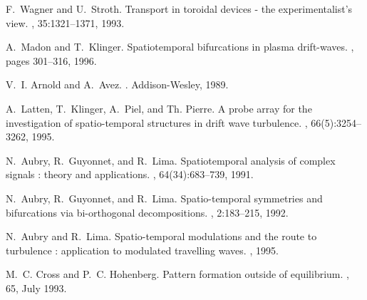 \begin{thebibliography}{10}
F.~Wagner and U.~Stroth.
\newblock Transport in toroidal devices - the experimentalist's view.
, 35:1321--1371, 1993.

A.~Madon and T.~Klinger.
\newblock Spatiotemporal bifurcations in plasma drift-waves.
, pages 301--316, 1996.

V.~I. Arnold and A.~Avez.
.
\newblock Addison-Wesley, 1989.

A.~Latten, T.~Klinger, A.~Piel, and Th. Pierre.
\newblock A probe array for the investigation of spatio-temporal structures in
  drift wave turbulence.
, 66(5):3254--3262, 1995.

N.~Aubry, R.~Guyonnet, and R.~Lima.
\newblock Spatiotemporal analysis of complex signals : theory and applications.
, 64(34):683--739, 1991.

N.~Aubry, R.~Guyonnet, and R.~Lima.
\newblock Spatio-temporal symmetries and bifurcations via bi-orthogonal
  decompositions.
, 2:183--215, 1992.

N.~Aubry and R.~Lima.
\newblock Spatio-temporal modulations and the route to turbulence : application
  to modulated travelling waves.
, 1995.

M.~C. Cross and P.~C. Hohenberg.
\newblock Pattern formation outside of equilibrium.
, 65, July 1993.

\end{thebibliography}









